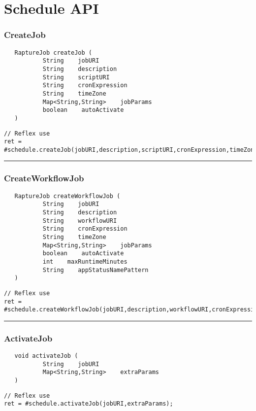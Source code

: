 \section{Schedule API}

\subsubsection{CreateJob}
\label{Api:CreateJob}
\begin{verbatim}
   RaptureJob createJob (
           String    jobURI
           String    description
           String    scriptURI
           String    cronExpression
           String    timeZone
           Map<String,String>    jobParams
           boolean    autoActivate
   )
\end{verbatim}
\begin{lstlisting}[language=reflex]
// Reflex use
ret = #schedule.createJob(jobURI,description,scriptURI,cronExpression,timeZone,jobParams,autoActivate);
\end{lstlisting}



\rule{15cm}{2pt}
\subsubsection{CreateWorkflowJob}
\label{Api:CreateWorkflowJob}
\begin{verbatim}
   RaptureJob createWorkflowJob (
           String    jobURI
           String    description
           String    workflowURI
           String    cronExpression
           String    timeZone
           Map<String,String>    jobParams
           boolean    autoActivate
           int    maxRuntimeMinutes
           String    appStatusNamePattern
   )
\end{verbatim}
\begin{lstlisting}[language=reflex]
// Reflex use
ret = #schedule.createWorkflowJob(jobURI,description,workflowURI,cronExpression,timeZone,jobParams,autoActivate,maxRuntimeMinutes,appStatusNamePattern);
\end{lstlisting}



\rule{15cm}{2pt}
\subsubsection{ActivateJob}
\label{Api:ActivateJob}
\begin{verbatim}
   void activateJob (
           String    jobURI
           Map<String,String>    extraParams
   )
\end{verbatim}
\begin{lstlisting}[language=reflex]
// Reflex use
ret = #schedule.activateJob(jobURI,extraParams);
\end{lstlisting}



